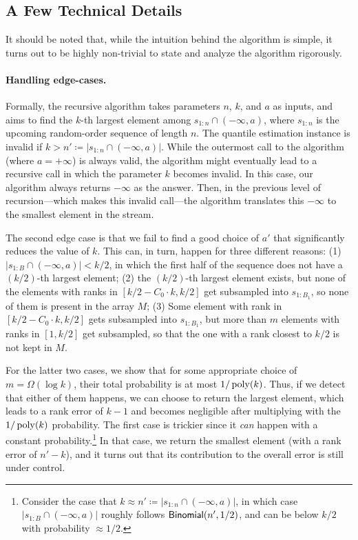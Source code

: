 \subsection{A Few Technical Details}\label{sec:overview-details}

It should be noted that, while the intuition behind the algorithm is simple, it turns out to be highly non-trivial to state and analyze the algorithm rigorously.

\paragraph{Handling edge-cases.} Formally, the recursive algorithm takes parameters $n$, $k$, and $a$ as inputs, and aims to find the $k$-th largest element among $s_{1:n} \cap (-\infty, a)$, where $s_{1:n}$ is the upcoming random-order sequence of length $n$. The quantile estimation instance is invalid if $k > n' \coloneqq |s_{1:n} \cap (-\infty, a)|$. While the outermost call to the algorithm (where $a = +\infty$) is always valid, the algorithm might eventually lead to a recursive call in which the parameter $k$ becomes invalid. In this case, our algorithm always returns $-\infty$ as the answer. Then, in the previous level of recursion---which makes this invalid call---the algorithm translates this $-\infty$ to the smallest element in the stream.

The second edge case is that we fail to find a good choice of $a'$ that significantly reduces the value of $k$. This can, in turn, happen for three different reasons: (1) $|s_{1:B} \cap (-\infty, a)| < k/2$, in which the first half of the sequence does not have a $(k/2)$-th largest element; (2) the $(k/2)$-th largest element exists, but none of the elements with ranks in $[k/2 - C_0\cdot k, k/2]$ get subsampled into $s_{1:B_1}$, so none of them is present in the array $M$; (3) Some element with rank in $[k/2 - C_0\cdot k, k/2]$ gets subsampled into $s_{1:B_1}$, but more than $m$ elements with ranks in $[1, k/2]$ get subsampled, so that the one with a rank closest to $k/2$ is not kept in $M$.

For the latter two cases, we show that for some appropriate choice of $m = \Omega(\log k)$, their total probability is at most $1/\operatorname*{poly}(k)$. Thus, if we detect that either of them happens, we can choose to return the largest element, which leads to a rank error of $k-1$ and becomes negligible after multiplying with the $1/\operatorname*{poly}(k)$ probability. The first case is trickier since it \emph{can} happen with a constant probability.\footnote{Consider the case that $k \approx n' \coloneqq |s_{1:n} \cap (-\infty, a)|$, in which case $|s_{1:B} \cap (-\infty, a)|$ roughly follows $\mathsf{Binomial}(n', 1/2)$, and can be below $k/2$ with probability $\approx 1/2$.} In that case, we return the smallest element (with a rank error of $n' - k$), and it turns out that its contribution to the overall error is still under control.

